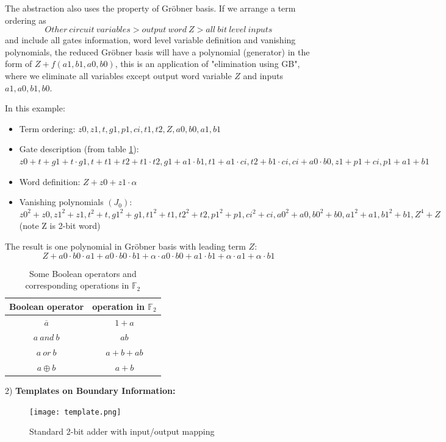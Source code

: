 The abstraction also uses the property of Gr\"obner basis. If we arrange a term ordering as
$$Other\ circuit\ variables > output\ word\ Z > all\ bit\ level\ inputs$$
and include all gates information, word level variable definition and vanishing polynomials,
the reduced Gr\"obner basis will have a polynomial (generator) in the form of $Z + f(a1,b1,a0,b0)$,
this is an application of "elimination using GB", where we eliminate all variables except output
word variable $Z$ and inputs $a1,a0,b1,b0$.

In this example:

\begin{itemize}
\item Term ordering: $z0,z1,t,g1,p1,ci,t1,t2,Z,a0,b0,a1,b1$
\item Gate description (from table \ref{table:booltogalois_op}): $z0+t+g1+t\cdot g1, t+t1+t2+t1\cdot t2, g1+a1\cdot b1,
			t1+a1\cdot ci, t2+b1\cdot ci, ci+a0\cdot b0, z1+p1+ci, p1+a1+b1$
\item Word definition: $Z+z0+z1\cdot \alpha$
\item Vanishing polynomials $(J_0)$: $z0^2+z0, z1^2+z1, t^2+t, g1^2+g1, t1^2+t1, t2^2+t2, p1^2+p1, ci^2+ci,
			a0^2+a0, b0^2+b0, a1^2+a1, b1^2+b1, Z^4+Z$(note Z is 2-bit word)
\end{itemize}

The result is one polynomial in Gr\"obner basis with leading term $Z$:
$$Z+a0\cdot b0\cdot a1+a0\cdot b0\cdot b1+\alpha\cdot a0\cdot b0+a1\cdot b1+\alpha\cdot a1+\alpha\cdot b1$$

\begin{table}
\centering
\begin{tabular}{|c|c|} \hline
Boolean operator & operation in $\mathbb{F}_{2}$\\ \hline
$\overline{a}$ & $1 + a$\\ \hline
$a\ and\ b$ & $ab$\\ \hline
$a\ or\ b$ & $a + b + ab$\\ \hline
$a \oplus b$ & $a + b$\\
\hline\end{tabular}
\caption{Some Boolean operators and corresponding operations in $\mathbb{F}_{2}$}
\label{table:booltogalois_op}
\end{table}

2) {\bf Templates on Boundary Information:}
\begin{figure}[hbt]
	\begin{center}
	\texttt{[image: template.png]}
	\end{center}
	\caption{Standard 2-bit adder with input/output mapping}
	\label{fig:template}
\end{figure}

